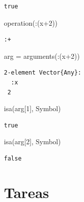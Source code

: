 \documentclass[
  a4paper,
]{scrreport}
\newenvironment{Shaded}{\begin{snugshade}}{\end{snugshade}}
\newcommand{\DataTypeTok}[1]{\textcolor[rgb]{0.68,0.00,0.00}{#1}}
\newcommand{\FloatTok}[1]{\textcolor[rgb]{0.68,0.00,0.00}{#1}}
\newcommand{\FunctionTok}[1]{\textcolor[rgb]{0.28,0.35,0.67}{#1}}
\newcommand{\NormalTok}[1]{\textcolor[rgb]{0.00,0.23,0.31}{#1}}
\newcommand{\OperatorTok}[1]{\textcolor[rgb]{0.37,0.37,0.37}{#1}}
\begin{document}
\begin{verbatim}
true
\end{verbatim}

\begin{Shaded}
\begin{Highlighting}[]
\FunctionTok{operation}\NormalTok{(}\OperatorTok{:}\NormalTok{(x}\OperatorTok{+}\FloatTok{2}\NormalTok{))}
\end{Highlighting}
\end{Shaded}

\begin{verbatim}
:+
\end{verbatim}

\begin{Shaded}
\begin{Highlighting}[]
\NormalTok{arg }\OperatorTok{=} \FunctionTok{arguments}\NormalTok{(}\OperatorTok{:}\NormalTok{(x}\OperatorTok{+}\FloatTok{2}\NormalTok{))}
\end{Highlighting}
\end{Shaded}

\begin{verbatim}
2-element Vector{Any}:
  :x
 2
\end{verbatim}

\begin{Shaded}
\begin{Highlighting}[]
\FunctionTok{isa}\NormalTok{(arg[}\FloatTok{1}\NormalTok{], }\DataTypeTok{Symbol}\NormalTok{)}
\end{Highlighting}
\end{Shaded}

\begin{verbatim}
true
\end{verbatim}

\begin{Shaded}
\begin{Highlighting}[]
\FunctionTok{isa}\NormalTok{(arg[}\FloatTok{2}\NormalTok{], }\DataTypeTok{Symbol}\NormalTok{)}
\end{Highlighting}
\end{Shaded}

\begin{verbatim}
false
\end{verbatim}

\hypertarget{tareas}{%
\section{Tareas}\label{tareas}}
\end{document}
